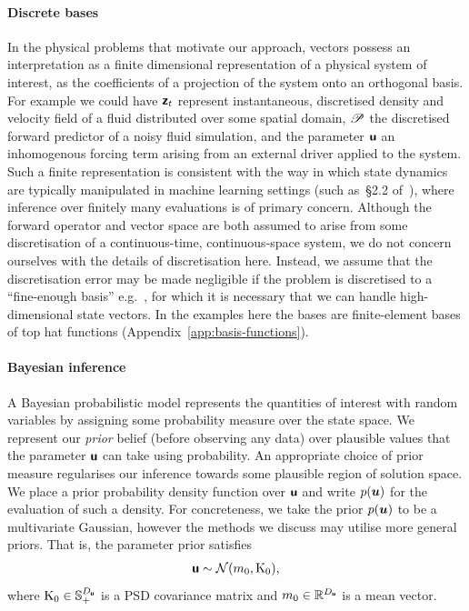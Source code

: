 \paragraph{Discrete bases} In the physical problems that motivate our approach, vectors possess an interpretation as a finite dimensional representation of a physical system of interest, as the coefficients of a projection of the system onto an orthogonal basis.
For example we could have \(\boldsymbol{\mathsf{z}}_{t}\) represent instantaneous, discretised density and velocity field of a fluid distributed over some spatial domain, \(\mathscr{P}\) the discretised forward predictor of a noisy fluid simulation, and the parameter $\boldsymbol{\mathsf{u}}$ an inhomogenous forcing term arising from an external driver applied to the system. 
Such a finite representation is consistent with the way in which state dynamics are typically manipulated in machine learning settings (such as~\S 2.2 of~\citet{RasmussenGaussian2006}), where inference over finitely many evaluations is of primary concern.
Although the forward operator and vector space are both assumed to arise from some discretisation of a continuous-time, continuous-space system, we do not concern ourselves with the details of discretisation here. Instead, we assume that the discretisation error may be made negligible if the problem is discretised to a ``fine-enough basis'' e.g.~\cite{LassasDiscretizationinvariant2009}, for which it is necessary that we can handle high-dimensional state vectors.
In the examples here the bases are finite-element bases of top hat functions (Appendix~\ref{app:basis-functions}).

\paragraph{Bayesian inference} A Bayesian probabilistic model represents the quantities of interest with random variables by assigning some probability measure over the state space.
We represent our \emph{prior} belief (before observing any data) over plausible values that the parameter $\boldsymbol{\mathsf{u}}$ can take using probability. 
An appropriate choice of prior measure regularises our inference towards some plausible region of solution space.
We place a prior probability density function over $\boldsymbol{\mathsf{u}}$ and write $p(\boldsymbol{u})$ for the evaluation of such a density. 
For concreteness, we take the prior $p(\boldsymbol{u})$ to be a multivariate Gaussian, however the methods we discuss may utilise more general priors.
That is, the parameter prior satisfies
\begin{align*}
\boldsymbol{\mathsf{u}} \sim \mathcal{N}(m_0,\mathrm{K}_0),
\end{align*}
where $\mathrm{K}_0 \in \mathbb{S}^{D_{\boldsymbol{\mathsf{u}}}}_+$ is a PSD covariance matrix and $m_0 \in \mathbb{R}^{D_{\boldsymbol{\mathsf{u}}}}$ is a mean vector.

